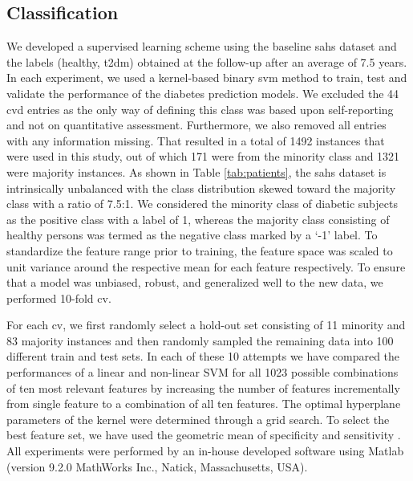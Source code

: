 \documentclass[journal,comsoc]{IEEEtran}
\renewcommand{\^}{\hat}  %
\begin{document}
\subsection{Classification}
%
We developed a supervised learning scheme using the baseline \ac{sahs} dataset and the labels (healthy, \ac{t2dm}) obtained at the follow-up after an average of \num{7.5} years. In each experiment, we used a kernel-based binary \ac{svm} method to train, test and validate the performance of the diabetes prediction models.  We excluded the \num{44} \ac{cvd} entries as the only way of defining this class was based upon self-reporting and not on quantitative assessment. Furthermore, we also removed all entries with any information missing. That resulted in a total of \num[group-minimum-digits=4, group-separator = {,}]{1492} instances that were used in this study, out of which \num{171} were from the minority class and \num[group-minimum-digits=4, group-separator = {,}]{1321} were majority instances. As shown in Table \ref{tab:patients}, the \ac{sahs} dataset is intrinsically unbalanced with the class distribution skewed toward the majority class with a ratio of 7.5:1. We considered the minority class of diabetic subjects as the positive class with a label of 1, whereas the majority class consisting of healthy persons was termed as the negative class marked by a `-1' label. To standardize the feature range prior to training, the feature space was scaled to unit variance around the respective mean for each feature respectively. To ensure that a model was unbiased, robust, and generalized well to the new data, we performed 10-fold \ac{cv}.


For each \ac{cv}, we first randomly select a hold-out set consisting of \num{11} minority and \num{83} majority instances and then randomly sampled the remaining data into \num{100} different train and test sets.  In each of these 10 attempts we have compared the performances of a linear and non-linear SVM for all \num[group-minimum-digits=4, group-separator = {,}]{1023} possible combinations of ten most relevant features by increasing  the number of features incrementally from single feature to a combination of all ten features. The optimal hyperplane parameters of the kernel were determined through a grid search.   To select the best feature set, we have used the geometric mean of specificity and sensitivity \cite{kubat1997addressing}. All experiments were performed by an in-house developed software using Matlab \textregistered (version 9.2.0 MathWorks Inc., Natick, Massachusetts, USA).
%
%
%
%
\end{document}
